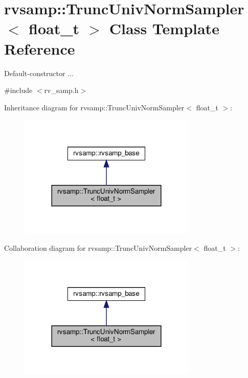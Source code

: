 \hypertarget{classrvsamp_1_1TruncUnivNormSampler}{}\section{rvsamp\+:\+:Trunc\+Univ\+Norm\+Sampler$<$ float\+\_\+t $>$ Class Template Reference}
\label{classrvsamp_1_1TruncUnivNormSampler}


Default-\/constructor ...  




{\ttfamily \#include $<$rv\+\_\+samp.\+h$>$}



Inheritance diagram for rvsamp\+:\+:Trunc\+Univ\+Norm\+Sampler$<$ float\+\_\+t $>$\+:
\nopagebreak
\begin{figure}[H]
\begin{center}
\leavevmode
\includegraphics[width=240pt]{classrvsamp_1_1TruncUnivNormSampler__inherit__graph}
\end{center}
\end{figure}


Collaboration diagram for rvsamp\+:\+:Trunc\+Univ\+Norm\+Sampler$<$ float\+\_\+t $>$\+:
\nopagebreak
\begin{figure}[H]
\begin{center}
\leavevmode
\includegraphics[width=240pt]{classrvsamp_1_1TruncUnivNormSampler__coll__graph}
\end{center}
\end{figure}
